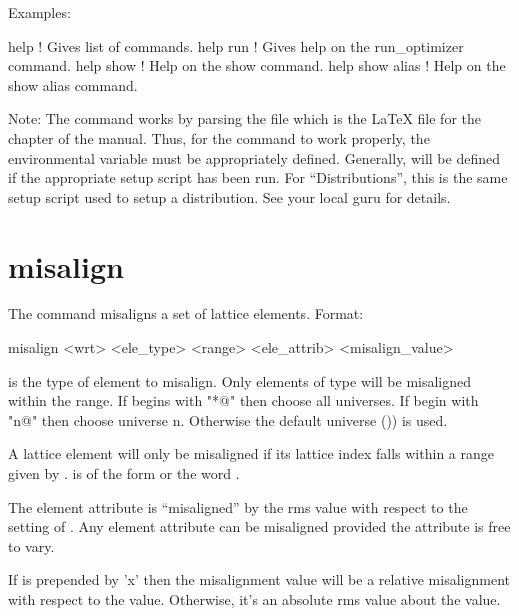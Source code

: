 Examples:
\begin{example}
  help            ! Gives list of commands.
  help run        ! Gives help on the run_optimizer command.
  help show       ! Help on the show command.
  help show alias ! Help on the show alias command.
\end{example}

Note: The  command works by parsing the file 
which is the LaTeX file for the  chapter of the \tao manual. Thus, for
the  command to work properly, the environmental variable  must be
appropriately defined. Generally,  will be defined if the appropriate setup
script has been run. For ``Distributions'', this is the same setup script used to setup a
distribution. See your local \bmad guru for details.

\section{misalign}
\label{s:misalign}

The  command misaligns a set of lattice elements. Format:
\begin{example}
   misalign <wrt> <ele_type> <range> <ele_attrib> <misalign_value>
\end{example}

\vskip 10pt 

 is the type of element to misalign.  Only elements of type 
will be misaligned within the range.  If  begins with "*@" then choose all
universes. If  begin with "n@" then choose universe n. Otherwise the
default universe ()) is used.

A lattice element will only be misaligned if its lattice index falls within a range given
by .  is of the form  or the word .

The element attribute  is ``misaligned'' by the rms value
 with respect to the setting of . Any element attribute can
be misaligned provided the attribute is free to vary.

If  is prepended by 'x' then the misalignment value will be a
relative misalignment with respect to the  value. Otherwise, it's an absolute
rms value about the  value.

